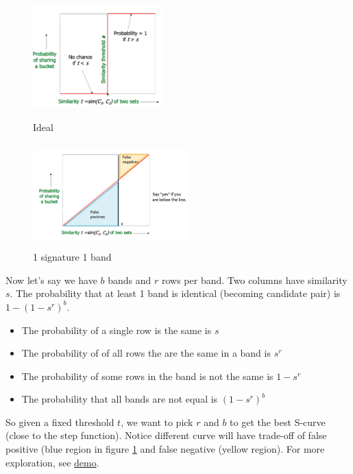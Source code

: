 \begin{figure}[h]
  \centering
  \begin{minipage}[b]{5cm}
    \includegraphics[width=5cm, height = 4cm]{figs/002_LSH_ideal.PNG}
    \caption{Ideal}
    \label{fig:LSH_ideal}
  \end{minipage}
  \hfill
  \begin{minipage}[b]{6cm}
    \includegraphics[width=6cm, height = 4cm]{figs/003_LSH_1_1.PNG}
    \caption{1 signature 1 band}
    \label{fig:LSH_1_1}
  \end{minipage}
\end{figure}

Now let's say we have $b$ bands and $r$ rows per band. Two columns have similarity $s$. The probability that at least 1 band is identical (becoming candidate pair) is $1 - (1 - s^r)^b$.
    \begin{itemize}
        \item The probability of a single row is the same is $s$
        \item The probability of of all rows the are the same in a band is $s^r$
        \item The probability of some rows in the band is not the same is $1 - s^r$
        \item The probability that all bands are not equal is $(1 - s^r)^b$
    \end{itemize}

So given a fixed threshold $t$, we want to pick $r$ and $b$ to get the best S-curve (close to the step function). Notice different curve will have trade-off of false positive (blue region in figure \ref{fig:LSH_1_1} and false negative (yellow region). For more exploration, see \href{https://www.desmos.com/calculator/lzzvfjiujn}{demo}. 


